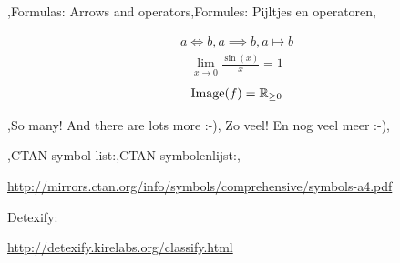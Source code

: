 \documentclass[presentatie.tex]{subfiles}
\begin{document}

\begin{frame}
	{\lang,Formulas: Arrows and operators,Formules: Pijltjes en operatoren,}


	\vspace{-10pt}
	\begin{align*}
		a \iff b, a\implies b, a\mapsto b
	\end{align*}
	\begin{align*}
		\lim_{x\to 0}\frac{\sin(x)}{x} = 1
	\end{align*}
	\begin{align*}
		\operatorname{Image}(f) = \mathbb{R}_{\geq 0}
	\end{align*}
\end{frame}

\begin{frame}
	\begin{center}
		\lang,So many! And there are lots more :-), Zo veel! En nog veel meer :-),
	\end{center}

	\begin{center}
		\lang,CTAN symbol list:,CTAN symbolenlijst:,\par
		\url{http://mirrors.ctan.org/info/symbols/comprehensive/symbols-a4.pdf}
	\end{center}
	
	\begin{center}
		Detexify:\par
		\url{http://detexify.kirelabs.org/classify.html}
	\end{center}
\end{frame}

\end{document}
